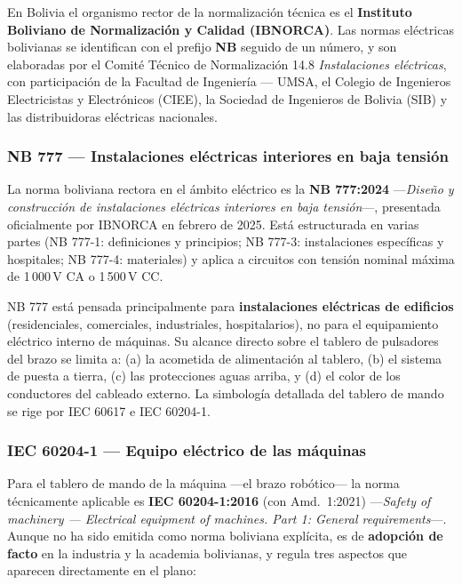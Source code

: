 \documentclass[11pt]{article}
\begin{document}
En Bolivia el organismo rector de la normalización técnica es el
\textbf{Instituto Boliviano de Normalización y Calidad (IBNORCA)}. Las
normas eléctricas bolivianas se identifican con el prefijo \textbf{NB}
seguido de un número, y son elaboradas por el Comité Técnico de
Normalización 14.8 \emph{Instalaciones eléctricas}, con participación
de la Facultad de Ingeniería — UMSA, el Colegio de Ingenieros
Electricistas y Electrónicos (CIEE), la Sociedad de Ingenieros de
Bolivia (SIB) y las distribuidoras eléctricas nacionales.

\subsubsection{NB 777 — Instalaciones eléctricas interiores en baja tensión}
La norma boliviana rectora en el ámbito eléctrico es la
\textbf{NB 777:2024} —\emph{Diseño y construcción de instalaciones
	eléctricas interiores en baja tensión}—, presentada oficialmente por
IBNORCA en febrero de 2025. Está estructurada en varias partes
(NB 777-1: definiciones y principios; NB 777-3: instalaciones
específicas y hospitales; NB 777-4: materiales) y aplica a
circuitos con tensión nominal máxima de 1\,000\,V CA o 1\,500\,V CC.

\begin{observa}
	NB 777 está pensada principalmente para \textbf{instalaciones
		eléctricas de edificios} (residenciales, comerciales, industriales,
	hospitalarios), no para el equipamiento eléctrico interno de máquinas.
	Su alcance directo sobre el tablero de pulsadores del brazo se limita
	a: (a) la acometida de alimentación al tablero, (b) el sistema de
	puesta a tierra, (c) las protecciones aguas arriba, y (d) el color de
	los conductores del cableado externo. La simbología detallada del
	tablero de mando se rige por IEC 60617 e IEC 60204-1.
\end{observa}

\subsubsection{IEC 60204-1 — Equipo eléctrico de las máquinas}
Para el tablero de mando de la máquina —el brazo robótico— la norma
técnicamente aplicable es \textbf{IEC 60204-1:2016} (con Amd.\ 1:2021)
—\emph{Safety of machinery — Electrical equipment of machines. Part 1:
	General requirements}—. Aunque no ha sido emitida como norma boliviana
explícita, es de \textbf{adopción de facto} en la industria y la
academia bolivianas, y regula tres aspectos que aparecen directamente
en el plano:
\end{document}
